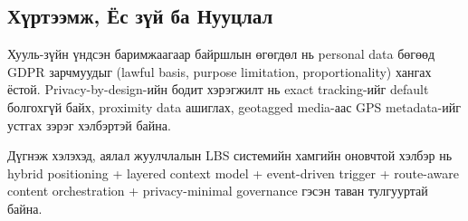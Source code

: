 \begin{sloppy}
\section*{Хүртээмж, Ёс зүй ба Нууцлал}
Хууль-зүйн үндсэн баримжаагаар байршлын өгөгдөл нь personal data бөгөөд GDPR зарчмуудыг (lawful basis, purpose limitation, proportionality) хангах ёстой. Privacy-by-design-ийн бодит хэрэгжилт нь exact tracking-ийг default болгохгүй байх, proximity data ашиглах, geotagged media-аас GPS metadata-ийг устгах зэрэг хэлбэртэй байна.

Дүгнэж хэлэхэд, аялал жуулчлалын LBS системийн хамгийн оновчтой хэлбэр нь hybrid positioning + layered context model + event-driven trigger + route-aware content orchestration + privacy-minimal governance гэсэн таван тулгууртай байна.

\end{sloppy}
